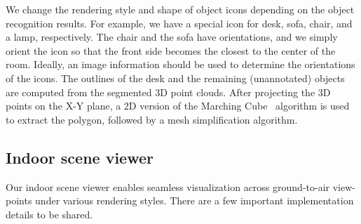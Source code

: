 

We change the rendering style and shape of object icons depending on the
object recognition results. For example, we have a special icon for
desk, sofa, chair, and a lamp, respectively. The chair and the sofa have
orientations, and we simply orient the icon so that the front side
becomes the closest to the center of the room. Ideally, an image
information should be used to determine the orientations of the
icons. The outlines of the desk and the remaining (unannotated) objects
are computed from the segmented 3D point clouds. After projecting the 3D
points on the X-Y plane, a 2D version of the Marching
Cube~\cite{MarchingCube} algorithm is used to extract the polygon,
followed by a mesh simplification algorithm.


\subsection{Indoor scene viewer}

Our indoor scene viewer enables seamless visualization across
ground-to-air view-points under various rendering styles. There are a
few important implementation details to be shared.

